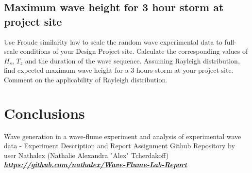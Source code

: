 \documentclass{article}
\begin{document}
	\subsection{Maximum wave height for 3 hour storm at project site}
	Use Froude similarity law to scale the random wave experimental data to full-scale	conditions of your Design Project site. Calculate the corresponding values of $H_s$, $T_z$ and the duration of the wave sequence. Assuming Rayleigh distribution, find	expected maximum wave height for a 3 hours storm at your project site. Comment on the applicability of Rayleigh distribution.
	\section{Conclusions}
	\begin{thebibliography}{1}
		 Wave generation in a wave-flume experiment and analysis of experimental wave data - Experiment Description and Report Assignment
		 Github Repository by user Nathalex (Nathalie Alexandra "Alex" Tcherdakoff)\\ \href{https://github.com/nathalex/Wave-Flume-Lab-Report}{\textbf{\textit{https://github.com/nathalex/Wave-Flume-Lab-Report}}}
	\end{thebibliography}
\end{document}
